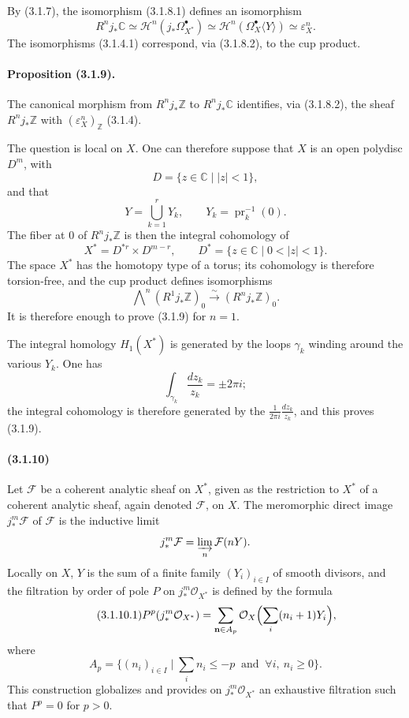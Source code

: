 \documentclass[10pt]{article}
\newcommand{\C}{\mathbb C}
\newcommand{\Z}{\mathbb Z}
\providecommand{\cO}{\mathcal O}
\providecommand{\cO}{\mathcal O}
\begin{document}
By (3.1.7), the isomorphism (3.1.8.1) defines an isomorphism
\[
\tag{3.1.8.2}
R^nj_*\C\simeq \mathcal H^n(j_*\Omega_{X^*}^\bullet)
\simeq \mathcal H^n(\Omega_X^\bullet\langle Y\rangle)
\simeq \varepsilon_X^n.
\]
The isomorphisms (3.1.4.1) correspond, via (3.1.8.2), to the cup product.

\paragraph{Proposition (3.1.9).} The canonical morphism from $R^nj_*\Z$ to $R^nj_*\C$ identifies, via (3.1.8.2), the sheaf $R^nj_*\Z$ with $(\varepsilon_X^n)_\Z$ (3.1.4).

The question is local on $X$. One can therefore suppose that $X$ is an open polydisc $D^m$, with
\[
D=\{z\in\C\mid |z|<1\},
\]
and that
\[
Y=\bigcup_{k=1}^rY_k,\qquad Y_k=\operatorname{pr}_k^{-1}(0).
\]
The fiber at $0$ of $R^nj_*\Z$ is then the integral cohomology of
\[
X^*=D^{*r}\times D^{m-r},
\qquad
D^*=\{z\in\C\mid 0<|z|<1\}.
\]
The space $X^*$ has the homotopy type of a torus; its cohomology is therefore torsion-free, and the cup product defines isomorphisms
\[
\bigwedge\nolimits^n(R^1j_*\Z)_0\xrightarrow{\sim}(R^nj_*\Z)_0.
\]
It is therefore enough to prove (3.1.9) for $n=1$.

The integral homology $H_1(X^*)$ is generated by the loops $\gamma_k$ winding around the various $Y_k$. One has
\[
\int_{\gamma_k}\frac{dz_k}{z_k}=\pm2\pi i;
\]
the integral cohomology is therefore generated by the $\frac1{2\pi i}\frac{dz_k}{z_k}$, and this proves (3.1.9).

\paragraph{(3.1.10)} Let $\mathcal F$ be a coherent analytic sheaf on $X^*$, given as the restriction to $X^*$ of a coherent analytic sheaf, again denoted $\mathcal F$, on $X$. The meromorphic direct image $j_*^m\mathcal F$ of $\mathcal F$ is the inductive limit
\[
j_*^m\mathcal F=\varinjlim_n \mathcal F(nY).
\]
Locally on $X$, $Y$ is the sum of a finite family $(Y_i)_{i\in I}$ of smooth divisors, and the filtration by order of pole $P$ on $j_*^m\cO_{X^*}$ is defined by the formula
\[
\tag{3.1.10.1}
P^p(j_*^m\cO_{X^*})=
\sum_{\mathbf n\in A_p}\cO_X\Bigl(\sum_i(n_i+1)Y_i\Bigr),
\]
where
\[
A_p=\{(n_i)_{i\in I}\mid \sum_i n_i\le -p\ \text{ and }\ \forall i,\ n_i\ge0\}.
\]
This construction globalizes and provides on $j_*^m\cO_{X^*}$ an exhaustive filtration such that $P^p=0$ for $p>0$.
\end{document}
